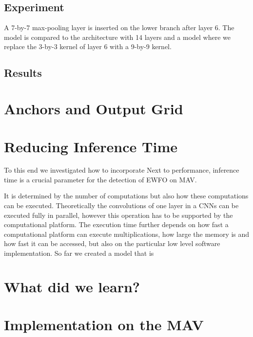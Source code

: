 	\subsection{Experiment}
	
	 A 7-by-7 max-pooling layer is inserted on the lower branch after layer 6. The model is compared to the architecture with 14 layers and a model where we replace the 3-by-3 kernel of layer 6 with a 9-by-9 kernel.
	 
	 \subsection{Results}
	 
	\section{Anchors and Output Grid}
		
	\section{Reducing Inference Time}
	
	To this end we investigated how to incorporate 
	Next to performance, inference time is a crucial parameter for the detection of \ac{EWFO} on \ac{MAV}. 
	
	 It is determined by the number of computations but also how these computations can be executed. Theoretically the convolutions of one layer in a \acp{CNN} can be executed fully in parallel, however this operation has to be supported by the computational platform. The execution time further depends on how fast a computational platform can execute multiplications, how large the memory is and how fast it can be accessed, but also on the particular low level software implementation. So far we created a model that is 
	 
	 \section{What did we learn?}
	
	\section{Implementation on the \ac{MAV}}
